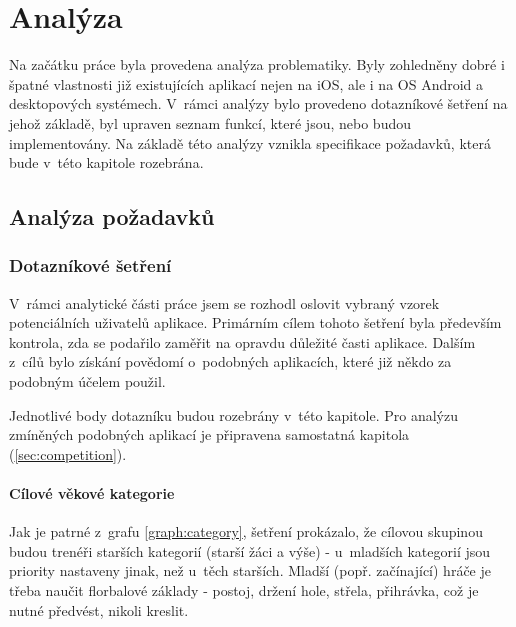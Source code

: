\documentclass[thesis=B,czech]{FITthesis}[2012/06/26]
\begin{document}
\chapter{Analýza}

	Na začátku práce byla provedena analýza problematiky. Byly zohledněny dobré i špatné vlastnosti již existujících aplikací nejen na iOS, ale i na OS Android a desktopových systémech. V~rámci analýzy bylo provedeno dotazníkové šetření na jehož základě, byl upraven seznam funkcí, které jsou, nebo budou implementovány. Na základě této analýzy vznikla specifikace požadavků, která bude v~této kapitole rozebrána.

\section{Analýza požadavků}

\subsection{Dotazníkové šetření}\label{sec:survey}

	V~rámci analytické části práce jsem se rozhodl oslovit vybraný vzorek potenciálních uživatelů aplikace. Primárním cílem tohoto šetření byla především kontrola, zda se podařilo zaměřit na opravdu důležité časti aplikace. Dalším z~cílů bylo získání povědomí o~podobných aplikacích, které již někdo za podobným účelem použil.

	Jednotlivé body dotazníku budou rozebrány v~této kapitole. Pro analýzu zmíněných podobných aplikací je připravena samostatná kapitola (\ref{sec:competition}).

\subsubsection{Cílové věkové kategorie} \label{sec:target_group}

	Jak je patrné z~grafu \ref{graph:category}, šetření prokázalo, že cílovou skupinou budou trenéři starších kategorií (starší žáci a výše) \-- u~mladších kategorií jsou priority nastaveny jinak, než u~těch starších. Mladší (popř. začínající) hráče je třeba naučit florbalové základy \-- postoj, držení hole, střela, přihrávka, což je nutné předvést, nikoli kreslit.
\end{document}
